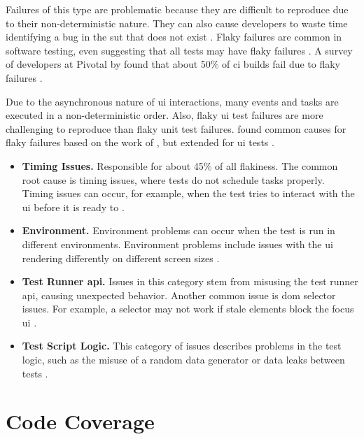 Failures of this type are problematic because they are difficult to reproduce due to their non-deterministic nature.
They can also cause developers to waste time identifying a bug in the \ac{sut} that does not exist \autocite{ziftci_-flake_2020}.
Flaky failures are common in software testing, \citeauthor*{harman_start-ups_2018} even suggesting that all tests may have flaky failures \autocite{harman_start-ups_2018}.
A survey of developers at Pivotal by \citeauthor*{hilton_trade-offs_2017} found that about 50\% of \ac{ci} builds fail due to flaky failures \autocite{hilton_trade-offs_2017}.

Due to the asynchronous nature of \ac{ui} interactions, many events and tasks are executed in a non-deterministic order.
Also, flaky \ac{ui} test failures are more challenging to reproduce than flaky unit test failures.
 found common causes for flaky failures based on the work of \citeauthor*{luo_empirical_2014}, but extended for \ac{ui} tests \autocite{luo_empirical_2014,romano_empirical_2021}.

\begin{itemize}
	\item \textbf{Timing Issues.} Responsible for about 45\% of all flakiness. The common root cause is timing issues, where tests do not schedule tasks properly.
	      Timing issues can occur, for example, when the test tries to interact with the \ac{ui} before it is ready to \autocite{romano_empirical_2021}.
	\item \textbf{Environment.} Environment problems can occur when the test is run in different environments.
	      Environment problems include issues with the \ac{ui} rendering differently on different screen sizes \autocite{romano_empirical_2021}.
	\item \textbf{Test Runner \acs{api}.} Issues in this category stem from misusing the test runner \ac{api}, causing unexpected behavior.
	      Another common issue is \ac{dom} selector issues. For example, a selector may not work if stale elements block the focus \ac{ui} \autocite{romano_empirical_2021}.
	\item \textbf{Test Script Logic.} This category of issues describes problems in the test logic, such as the misuse of a random data generator or data leaks between tests \autocite{romano_empirical_2021}.
\end{itemize}


\section{Code Coverage}

